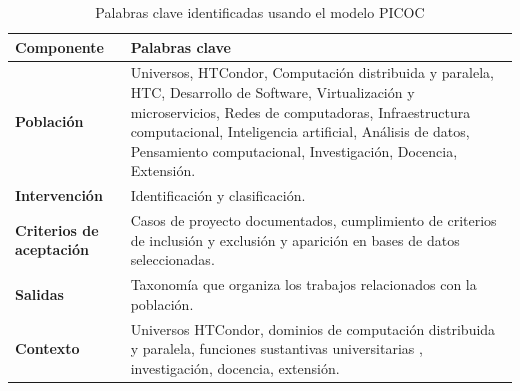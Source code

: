 \begin{table}[htbp]
	\centering
	\caption{Palabras clave identificadas usando el modelo PICOC}
	\label{table:picoc_keywords}
	\renewcommand{\arraystretch}{1}  %
	\begin{tabular}{p{1.8cm}p{6cm}}
		\toprule
		\textbf{Componente}              & \textbf{Palabras clave}                                                                                                                                                                                                                                                                 \\
		\midrule
		\textbf{Población}               & Universos, HTCondor, Computación distribuida y paralela, HTC, Desarrollo de Software, Virtualización y microservicios, Redes de computadoras, Infraestructura computacional, Inteligencia artificial, Análisis de datos, Pensamiento computacional, Investigación, Docencia, Extensión. \\
		\addlinespace[0.8em]
		\textbf{Intervención}            & Identificación y clasificación.                                                                                                                                                                                                                                                         \\
		\addlinespace[0.8em]
		\textbf{Criterios de aceptación} &
		Casos de proyecto documentados, cumplimiento de criterios de inclusión y exclusión y aparición en bases de datos seleccionadas.                                                                                                                                                                                            \\
		\addlinespace[0.8em]
		\textbf{Salidas}                 & Taxonomía que organiza los trabajos relacionados con la población.                                                                                                                                                                                                                      \\
		\addlinespace[0.8em]
		\textbf{Contexto}                & Universos HTCondor, dominios de computación distribuida y paralela, funciones sustantivas universitarias , investigación, docencia, extensión.                                                                                                                    \\
		\bottomrule
	\end{tabular}
\end{table}


